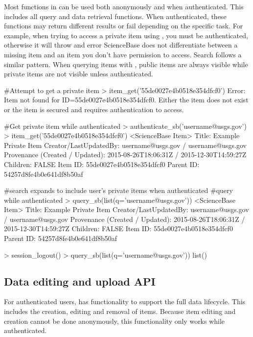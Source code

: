 Most functions in  can be used both anonymously and when
authenticated. This includes all query and data retrieval functions. 
When authenticated, these functions may return different results or fail
depending on the specific task. For example, when trying to access 
a private item using , you must be authenticated, otherwise
it will throw and error ScienceBase does not differentiate between a missing
item and an item you don't have permission to access. Search follows a similar
pattern. When querying items with , public items are always 
visible while private items are not visible unless authenticated. 

\begin{example}
#Attempt to get a private item
> item_get('55de0027e4b0518e354dfcf0')
 Error: Item not found for ID=55de0027e4b0518e354dfcf0. Either the 
 item does not exist or the item is secured and requires authentication to access. 

#Get private item while authenticated
> authenticate_sb('username@usgs.gov')
> item_get('55de0027e4b0518e354dfcf0')
 <ScienceBase Item> 
  Title: Example Private Item
  Creator/LastUpdatedBy:     username@usgs.gov / username@usgs.gov
  Provenance (Created / Updated):  2015-08-26T18:06:31Z / 2015-12-30T14:59:27Z
  Children: FALSE
  Item ID: 55de0027e4b0518e354dfcf0
  Parent ID: 54257d8fe4b0e641df8b50af
  
#search expands to include user's private items when authenticated
#query while authenticated
> query_sb(list(q='username@usgs.gov'))
 <ScienceBase Item> 
  Title: Example Private Item
  Creator/LastUpdatedBy:     username@usgs.gov / username@usgs.gov
  Provenance (Created / Updated):  2015-08-26T18:06:31Z / 2015-12-30T14:59:27Z
  Children: FALSE
  Item ID: 55de0027e4b0518e354dfcf0
  Parent ID: 54257d8fe4b0e641df8b50af
  
> session_logout()
> query_sb(list(q='username@usgs.gov'))
list()
\end{example}


\subsection{Data editing and upload API}
For authenticated users,  has functionality to support 
the full data lifecycle. This includes the creation, editing and removal
of items. Because item editing and creation cannot be done anonymously, 
this functionality only works while authenticated.

